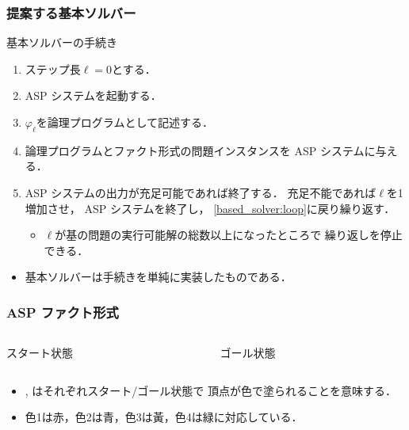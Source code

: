 \documentclass[dvipdfmx,11pt]{beamer}
\begin{document}
\begin{frame}\frametitle{提案する基本ソルバー}

  \begin{block}{基本ソルバーの手続き}
    \centering
    \begin{enumerate}
      \item ステップ長$\ell=0$とする．
      \item ASP システムを起動する．\label{based_solver:loop}
      \item $\varphi_{\ell}$を論理プログラムとして記述する．
      \item 論理プログラムとファクト形式の問題インスタンスを
            ASP システムに与える．
      \item ASP システムの出力が充足可能であれば終了する．
            充足不能であれば$\ell$を1増加させ，
            ASP システムを終了し，
            \ref{based_solver:loop}に戻り繰り返す．
            \begin{itemize}
              \item $\ell$が基の問題の実行可能解の総数以上になったところで
                    繰り返しを停止できる．
            \end{itemize}
    \end{enumerate}
  \end{block}

  \begin{itemize}
    \item 基本ソルバーは手続きを単純に実装したものである．
  \end{itemize}

\end{frame}

\begin{frame}\frametitle{ASP ファクト形式}
  
  \begin{columns}
    \begin{column}{0.45\textwidth}
      \centering
      
      スタート状態
    \end{column}
    \begin{column}{0.45\textwidth}
      \centering
      
      ゴール状態
    \end{column}
  \end{columns}

  \begin{block}{}
    
  \end{block}

  \begin{itemize}
    \item {}, はそれぞれスタート/ゴール状態で
          頂点が色で塗られることを意味する．
    \item 色1は赤，色2は青，色3は黃，色4は緑に対応している．
  \end{itemize}

\end{frame}
\end{document}

